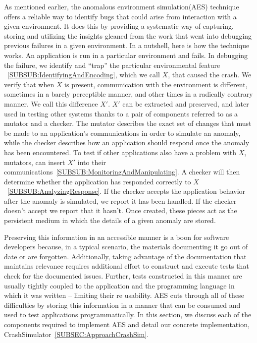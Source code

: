 As mentioned earlier,
the anomalous environment simulation(AES) technique
offers a reliable way to identify bugs that could arise from interaction
with a given environment.
It does this by providing a systematic way of
capturing, storing and utilizing the insights gleaned from the work that
went into debugging previous failures in a given environment.
In a nutshell,
here is how the technique works.
An application is run
in a particular environment and fails.
In debugging the failure,
we identify and “trap” the particular environmental feature
~\ref{SUBSUB:IdentifyingAndEncoding},
which we call $X$,
that caused the crash.
We verify that when $X$ is present,
communication with the
environment is different,
sometimes in a barely perceptible manner,
and other times in a radically contrary manner.
We call this difference $X'$.
$X'$ can be extracted and preserved,
and later used in testing other systems
thanks to a pair of components referred to as a mutator and a checker.
The mutator describes the exact set of changes
that must be made to an application’s communications
in order to simulate an anomaly,
while the checker describes how an
application should respond once the anomaly has been encountered.
To test if other applications also have a problem with $X$, mutators,
can insert $X'$ into their
communications~\ref{SUBSUB:MonitoringAndManipulating}.
A checker will then determine whether the
application has responded correctly to $X$~\ref{SUBSUB:AnalyzingResponse}.
If the checker accepts the application behavior
after the anomaly is simulated,
we report it has been handled.
If the checker doesn’t accept we report that it hasn’t.
Once created,
these pieces act as the persistent medium in which the details of
a given anomaly are stored.

Preserving this information in an accessible manner
is a boon for software developers because,
in a typical scenario, the materials documenting it
go out of date or are forgotten.
Additionally,
taking advantage of the documentation that maintains relevance
requires additional effort
to construct and execute tests
that check for the documented issues.
Further, tests constructed in this manner are
usually tightly coupled
to the application and the programming language in which it was written --
limiting their re usability.
AES cuts through all of these difficulties by
storing this information in a manner that can be consumed
and used to test applications programmatically.
In this section, we discuss each of the components
required to implement AES
and detail our concrete implementation,
CrashSimulator~\ref{SUBSEC:ApproachCrashSim}.

